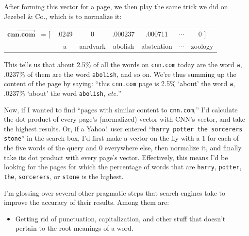 \begin{alttitles}
After forming this vector for a page, we then play the same trick we did on
Jezebel \& Co., which is to normalize it:

\vspace{-.15in}
\begin{center}
\begin{tabular}{ccccccc}
$\overrightarrow{\textbf{cnn.com}}$ \ = [ & \footnotesize{.0249} &
\footnotesize{0} & \footnotesize{.000237} & \footnotesize{.000711} & $\cdots$ &
\footnotesize{0} \quad ] \\
& \scriptsize{a} & \scriptsize{aardvark} & \scriptsize{abolish} &
\scriptsize{abstention} & $\cdots$ & \scriptsize{zoology} \quad \medskip \\
\end{tabular}
\end{center}
\vspace{-.15in}

This tells us that about 2.5\% of all the words on \texttt{cnn.com} today are
the word \texttt{a}, .0237\% of them are the word \texttt{abolish}, and so on.
We're thus summing up the content of the page by saying: ``this
\texttt{cnn.com} page is 2.5\% `about' the word \texttt{a}, .0237\% `about' the
word \texttt{abolish}, \textit{etc.}''


Now, if I wanted to find ``pages with similar content to \texttt{cnn.com},''
I'd calculate the dot product of every page's (normalized) vector with CNN's
vector, and take the highest results. Or, if a Yahoo!~user entered
``\texttt{harry potter the sorcerers stone}'' in the search box, I'd first make
a vector on the fly with a 1 for each of the five words of the query and 0
everywhere else, then normalize it, and finally take its dot product with every
page's vector. Effectively, this means I'd be looking for the pages for which
the percentage of words that are \texttt{harry}, \texttt{potter}, \texttt{the},
\texttt{sorcerers}, or \texttt{stone} is the highest.

\medskip

I'm glossing over several other pragmatic steps that search engines take to
improve the accuracy of their results. Among them are:

\vspace{-.1in}
\begin{itemize}

\item Getting rid of punctuation, capitalization, and other stuff that doesn't
pertain to the root meanings of a word.


\end{itemize}
\end{alttitles}
